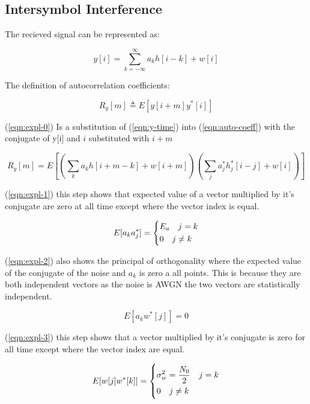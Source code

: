 \subsection{Intersymbol Interference}

The recieved signal can be represented as:

\begin{equation}
    \label{eqn:y-time}
    y[i] = \sum_{k=-\infty}^\infty a_k h[i-k] + w[i]
\end{equation}

The definition of autocorrelation coefficients:

\begin{equation}
    \label{eqn:auto-coeff}
    R_y[m] \triangleq E[y[i+m]y^*[i]]
\end{equation}

(\ref{eqn:expl-0}) Is a substitution of (\ref{eqn:y-time}) into (\ref{eqn:auto-coeff}) with the conjugate of y[i] and
$i$ substituted with $i+m$

\begin{equation}
    \label{eqn:expl-0}
    R_y[m] = E[(\sum_{k}a_kh[i+m-k]+w[i+m])(\sum_j a_j^* h_j^*[i-j]+w[i])]
\end{equation}

(\ref{eqn:expl-1}) this step shows that expected value of a vector multiplied by it's conjugate
are zero at all time except where the vector index is equal.

\begin{equation}
    \label{eqn:expl-1}
    E[a_k a_j^*] =
    \begin{dcases}
        E_a \quad j=k \\
        0 \quad j \neq k
    \end{dcases}
\end{equation}

(\ref{eqn:expl-2}) also shows the principal of orthogonality where the expected value of the conjugate of the noise and $a_k$ is
zero a all points. This is because they are both independent vectors as the noise is AWGN the two
vectors are statistically independent.

\begin{equation}
    \label{eqn:expl-2}
    E[a_k w^*[j]] = 0
\end{equation}

(\ref{eqn:expl-3}) this step shows that a vector multiplied by it's conjugate is zero for all time
except where the vector index are equal.

\begin{equation}
    \label{eqn:expl-3}
    E[w[j]w^*[k]] =
    \begin{dcases}
        \sigma_w^2 = \frac{N_0}{2} \quad j=k \\
        0 \quad j \neq k
    \end{dcases}
\end{equation}

